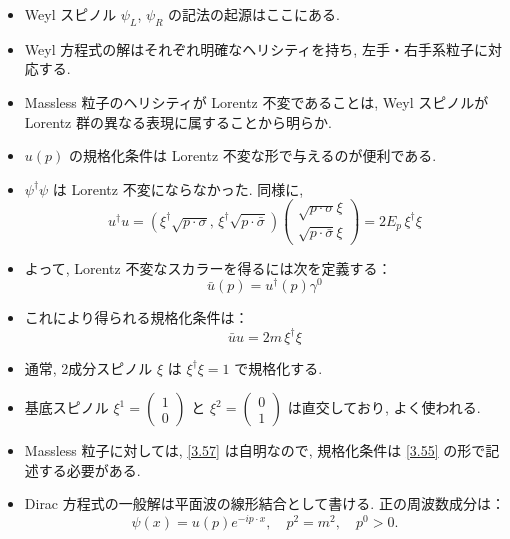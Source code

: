 \documentclass[a4paper,12pt]{article}
\begin{document}
\begin{itemize}
  \item Weyl スピノル $\psi_L$, $\psi_R$ の記法の起源はここにある.
  \item Weyl 方程式の解はそれぞれ明確なヘリシティを持ち, 左手・右手系粒子に対応する.
  \item Massless 粒子のヘリシティが Lorentz 不変であることは, Weyl スピノルが Lorentz 群の異なる表現に属することから明らか.

  \item $u(p)$ の規格化条件は Lorentz 不変な形で与えるのが便利である.
  \item $\psi^\dagger \psi$ は Lorentz 不変にならなかった. 同様に,
  \begin{equation*}
    u^\dagger u =
    \left( \xi^\dagger \sqrt{p \cdot \sigma},\, \xi^\dagger \sqrt{p \cdot \bar{\sigma}} \right)
    \begin{pmatrix}
      \sqrt{p \cdot \sigma} \xi \\
      \sqrt{p \cdot \bar{\sigma}} \xi
    \end{pmatrix}
    = 2E_p \, \xi^\dagger \xi \label{3.55}\tag{3.55}
  \end{equation*}

  \item よって, Lorentz 不変なスカラーを得るには次を定義する：
  \begin{equation*}
    \bar{u}(p) = u^\dagger(p) \gamma^0 \tag{3.56}
  \end{equation*}

  \item これにより得られる規格化条件は：
  \begin{equation*}
    \bar{u} u = 2m \, \xi^\dagger \xi \label{3.57}\tag{3.57}
  \end{equation*}

  \item 通常, 2成分スピノル $\xi$ は $\xi^\dagger \xi = 1$ で規格化する.
  \item 基底スピノル $\xi^1 = \begin{pmatrix} 1 \\ 0 \end{pmatrix}$ と $\xi^2 = \begin{pmatrix} 0 \\ 1 \end{pmatrix}$ は直交しており, よく使われる.

  \item Massless 粒子に対しては, \eqref{3.57} は自明なので, 規格化条件は \eqref{3.55} の形で記述する必要がある.

  \item Dirac 方程式の一般解は平面波の線形結合として書ける. 正の周波数成分は：
  \begin{equation*}
    \psi(x) = u(p)e^{-ip \cdot x}, \quad p^2 = m^2, \quad p^0 > 0. \tag{3.58}
  \end{equation*}


\end{itemize}
\end{document}
